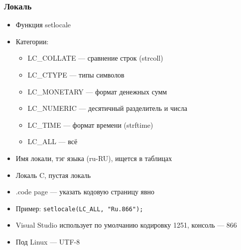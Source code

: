 \documentclass[xetex,mathserif,serif]{beamer}
\begin{document}
    \begin{frame}
        \frametitle{Локаль}
        \begin{itemize}
            \item Функция setlocale
            \item Категории: 
            \begin{itemize}
                \item LC\_COLLATE --- сравнение строк (strcoll)
                \item LC\_CTYPE --- типы символов 
                \item LC\_MONETARY --- формат денежных сумм
                \item LC\_NUMERIC --- десятичный разделитель и числа
                \item LC\_TIME --- формат времени (strftime)
                \item LC\_ALL --- всё
            \end{itemize}
            \item Имя локали, тэг языка (ru-RU), ищется в таблицах
            \item Локаль C, пустая локаль
            \item .code page --- указать кодовую страницу явно
            \item Пример: \texttt{setlocale(LC_ALL, "Ru.866");}
            \item Visual Studio использует по умолчанию кодировку 1251, консоль --- 866
            \item Под Linux --- UTF-8
        \end{itemize}
    \end{frame}
\end{document}
